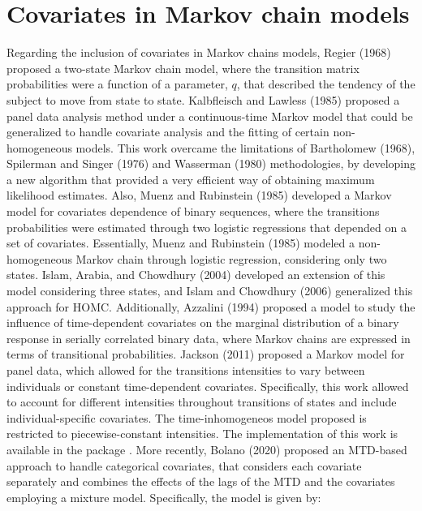 \hypertarget{covariates-in-markov-chain-models}{%
\section{Covariates in Markov chain models}\label{covariates-in-markov-chain-models}}

Regarding the inclusion of covariates in Markov chains models, Regier (1968) proposed a two-state Markov chain model, where the transition matrix probabilities were a function of a parameter, \(q\), that described the tendency of the subject to move from state to state. Kalbfleisch and Lawless (1985) proposed a panel data analysis method under a continuous-time Markov model that could be generalized to handle covariate analysis and the fitting of certain non-homogeneous models. This work overcame the limitations of Bartholomew (1968), Spilerman and Singer (1976) and Wasserman (1980) methodologies, by developing a new algorithm that provided a very efficient way of obtaining maximum likelihood estimates. Also, Muenz and Rubinstein (1985) developed a Markov model for covariates dependence of binary sequences, where the transitions probabilities were estimated through two logistic regressions that depended on a set of covariates. Essentially, Muenz and Rubinstein (1985) modeled a non-homogeneous Markov chain through logistic regression, considering only two states. Islam, Arabia, and Chowdhury (2004) developed an extension of this model considering three states, and Islam and Chowdhury (2006) generalized this approach for HOMC. Additionally, Azzalini (1994) proposed a model to study the influence of time-dependent covariates on the marginal distribution of a binary response in serially correlated binary data, where Markov chains are expressed in terms of transitional probabilities. Jackson (2011) proposed a Markov model for panel data, which allowed for the transitions intensities to vary between individuals or constant time-dependent covariates. Specifically, this work allowed to account for different intensities throughout transitions of states and include individual-specific covariates. The time-inhomogeneos model proposed is restricted to piecewise-constant intensities. The implementation of this work is available in the package . More recently, Bolano (2020) proposed an MTD-based approach to handle categorical covariates, that considers each covariate separately and combines the effects of the lags of the MTD and the covariates employing a mixture model. Specifically, the model is given by:

